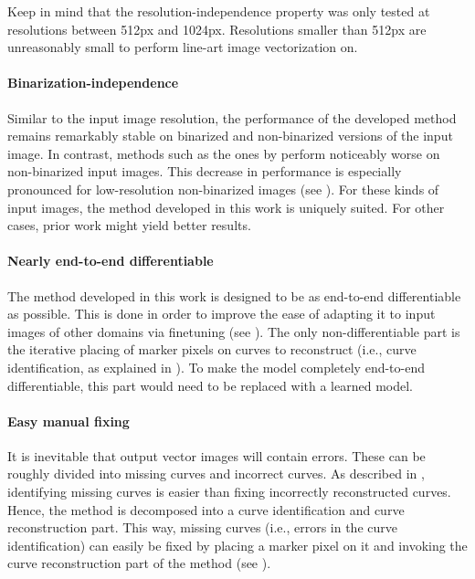Keep in mind that the resolution-independence property was only tested at resolutions between 512px and 1024px. Resolutions smaller than 512px are unreasonably small to perform line-art image vectorization on.

\paragraph{Binarization-independence}

Similar to the input image resolution, the performance of the developed method remains remarkably stable on binarized and non-binarized versions of the input image. In contrast, methods such as the ones by \citet{Puhachov2021KeypointPolyvector,autotrace} perform noticeably worse on non-binarized input images. This decrease in performance is especially pronounced for low-resolution non-binarized images (see ). For these kinds of input images, the method developed in this work is uniquely suited. For other cases, prior work might yield better results.

\paragraph{Nearly end-to-end differentiable}
\label{p:advtantages.e2e}

The method developed in this work is designed to be as end-to-end differentiable as possible. This is done in order to improve the ease of adapting it to input images of other domains via finetuning (see ). The only non-differentiable part is the iterative placing of marker pixels on curves to reconstruct (i.e., curve identification, as explained in ). To make the model completely end-to-end differentiable, this part would need to be replaced with a learned model.

\paragraph{Easy manual fixing}

It is inevitable that output vector images will contain errors. These can be roughly divided into missing curves and incorrect curves. As described in , identifying missing curves is easier than fixing incorrectly reconstructed curves. Hence, the method is decomposed into a curve identification and curve reconstruction part. This way, missing curves (i.e., errors in the curve identification) can easily be fixed by placing a marker pixel on it and invoking the curve reconstruction part of the method (see ).


